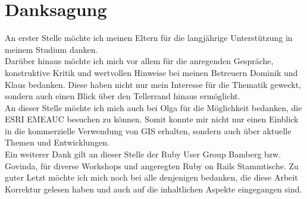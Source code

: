 \chapter*{Danksagung}
\label{ch0:Dank}

An erster Stelle möchte ich meinen Eltern für die langjährige Unterstützung in meinem Studium danken.\\
Darüber hinaus möchte ich mich vor allem für die anregenden Gespräche, konstruktive Kritik und wertvollen Hinweise bei meinen Betreuern Dominik und Klaus bedanken.
Diese haben nicht nur mein Interesse für die Thematik geweckt, sondern auch einen Blick über den Tellerrand hinaus ermöglicht.\\
An dieser Stelle möchte ich mich auch bei Olga für die Möglichkeit bedanken, die ESRI EMEAUC besuchen zu können. Somit konnte mir nicht nur einen Einblick in die kommerzielle Verwendung von GIS erhalten, sondern auch über aktuelle Themen und Entwicklungen.\\
Ein weiterer Dank gilt an dieser Stelle der Ruby User Group Bamberg bzw. Govinda, für diverse Workshops und angeregten Ruby on Rails Stammtische.
Zu guter Letzt möchte ich mich noch bei alle denjenigen bedanken, die diese Arbeit Korrektur gelesen haben und auch auf die inhaltlichen Aspekte eingegangen sind.\\

